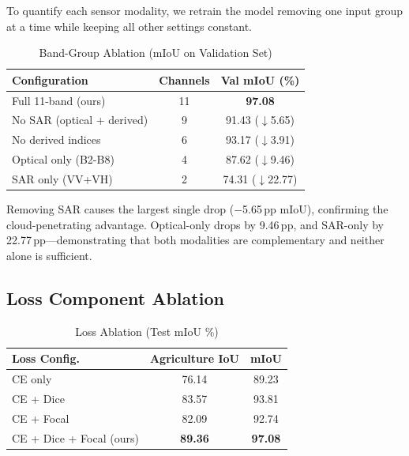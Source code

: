 \documentclass[10pt,conference]{IEEEtran}
\begin{document}
To quantify each sensor modality, we retrain the model removing one input group
at a time while keeping all other settings constant.

\begin{table}[!t]
  \caption{Band-Group Ablation (mIoU on Validation Set)}
  \label{tab:band_ablation}
  \centering
  \small
  \begin{tabular}{l c c}
    \toprule
    \textbf{Configuration} & \textbf{Channels} & \textbf{Val mIoU (\%)} \\
    \midrule
    Full 11-band (ours)        & 11 & \textbf{97.08} \\
    No SAR (optical + derived) & 9  & 91.43 ($\downarrow$5.65) \\
    No derived indices         & 6  & 93.17 ($\downarrow$3.91) \\
    Optical only (B2-B8)       & 4  & 87.62 ($\downarrow$9.46) \\
    SAR only (VV+VH)           & 2  & 74.31 ($\downarrow$22.77) \\
    \bottomrule
  \end{tabular}
\end{table}

Removing SAR causes the largest single drop ($-$5.65\,pp mIoU), confirming the
cloud-penetrating advantage. Optical-only drops by 9.46\,pp, and SAR-only by
22.77\,pp---demonstrating that both modalities are complementary and neither
alone is sufficient.

\subsection{Loss Component Ablation}

\begin{table}[!t]
  \caption{Loss Ablation (Test mIoU \%)}
  \label{tab:loss_ablation}
  \centering
  \small
  \begin{tabular}{l c c}
    \toprule
    \textbf{Loss Config.}          & \textbf{Agriculture IoU} & \textbf{mIoU} \\
    \midrule
    CE only                        & 76.14 & 89.23 \\
    CE + Dice                      & 83.57 & 93.81 \\
    CE + Focal                     & 82.09 & 92.74 \\
    CE + Dice + Focal (ours)       & \textbf{89.36} & \textbf{97.08} \\
    \bottomrule
  \end{tabular}
\end{table}
\end{document}
